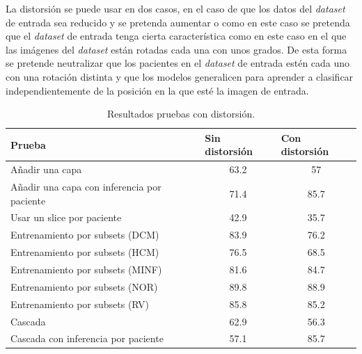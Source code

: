\documentclass[12pt,a4paper]{article}
\begin{document}
La distorsión se puede usar en dos casos, en el caso de que los datos del \textit{dataset} de entrada sea reducido y se pretenda aumentar o como en este caso se pretenda que el \textit{dataset} de entrada tenga cierta característica como en este caso en el que las imágenes del \textit{dataset} están rotadas cada una con unos grados. De esta forma se pretende neutralizar que los pacientes en el \textit{dataset} de entrada estén cada uno con una rotación distinta y que los modelos generalicen para aprender a clasificar independientemente de la posición en la que esté la imagen de entrada.

\begin{table}[H]
\centering
\begin{tabular}{|l|c|c|}
\hline
\textbf{Prueba}                             & \multicolumn{1}{l|}{\textbf{Sin distorsión}} & \multicolumn{1}{l|}{\textbf{Con distorsión}} \\ \hline
Añadir una capa                             & 63.2                                         & 57                                           \\ \hline
Añadir una capa con inferencia por paciente & 71.4                                         & 85.7                                         \\ \hline
Usar un slice por paciente                  & 42.9                                         & 35.7                                         \\ \hline
Entrenamiento por subsets (DCM)             & 83.9                                         & 76.2                                         \\ \hline
Entrenamiento por subsets (HCM)             & 76.5                                         & 68.5                                         \\ \hline
Entrenamiento por subsets (MINF)            & 81.6                                         & 84.7                                         \\ \hline
Entrenamiento por subsets (NOR)             & 89.8                                         & 88.9                                         \\ \hline
Entrenamiento por subsets (RV)              & 85.8                                         & 85.2                                         \\ \hline
Cascada                                     & 62.9                                         & 56.3                                         \\ \hline
Cascada con inferencia por paciente         & 57.1                                         & 85.7                                         \\ \hline
\end{tabular}
\caption{Resultados pruebas con distorsión.}
\end{table}
\end{document}
